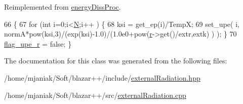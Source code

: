 Reimplemented from \hyperlink{classenergyDissProc_a6033524ea3d0fe38056bd74622f6c4ad}{energy\-Diss\-Proc}.


\begin{DoxyCode}
66                                  \{
67   \textcolor{keywordflow}{for} (\textcolor{keywordtype}{int} i=0;i<\hyperlink{classbaseClass_a2b4d07d2b46197d495de0477f4bb22f8}{N};i++ ) \{
68     ksi = get\_ep(i)/TempX;
69     set\_upe( i, normA*pow(ksi,3)/(exp(ksi)-1.0)/(1.0e0+pow(\hyperlink{classbaseClass_a482bb9b1d94f3eb3f31026d14e9a2bb6}{r}->get()/extr,extk) ) ); \}
70   \hyperlink{classenergyDissProc_a7b51925f603e271657cab66afe822591}{flag\_upe\_r} = \textcolor{keyword}{false}; \}
\end{DoxyCode}


The documentation for this class was generated from the following files\-:\begin{DoxyCompactItemize}
\item 
/home/mjaniak/\-Soft/blazar++/include/\hyperlink{externalRadiation_8hpp}{external\-Radiation.\-hpp}\item 
/home/mjaniak/\-Soft/blazar++/src/\hyperlink{externalRadiation_8cpp}{external\-Radiation.\-cpp}\end{DoxyCompactItemize}
